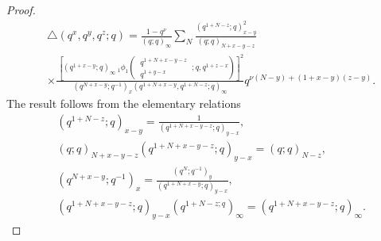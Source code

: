 \documentclass[12pt,a4paper]{amsart}
\numberwithin{equation}{section}
\theoremstyle{plain}
\theoremstyle{definition}
\theoremstyle{remark}
\numberwithin{equation}{section}
\numberwithin{table}{section}
\numberwithin{figure}{section}
\begin{document}
\begin{proof}
\begin{align*} &\triangle(q^x,q^y,q^z;q)=
\frac{1-q^{\nu}}{(q;q)_{\infty}} \sum_{N}\frac{(q^{1+N-z};q)^2_{x-y}}{(q;q)_{N+x-y-z}}\\&
\times \frac{\,\left[(q^{1+x-y};q)_{\infty}\ _{1}\phi_1\left(\begin{matrix} \ q^{1+N+x-y-z}\  \\
\ q^{1+y-x}\end{matrix};q,q^{1+z-x}\right) \right]^2
}{(q^{N+x-y};q^{-1})_{x}(q^{1+N+x-y},q^{1+N-z};q)_{\infty}}
q^{\nu(N-y)+(1+x-y)(z-y)}.
\end{align*}
The result follows from the elementary relations
\begin{align*}
&(q^{1+N-z};q)_{x-y}=\frac{1}{(q^{1+N+x-y-z};q)_{y-x}},\\&
(q;q)_{N+x-y-z}(q^{1+N+x-y-z};q)_{y-x}=(q;q)_{N-z},\\&
(q^{N+x-y};q^{-1})_{x}=\frac{(q^N;q^{-1})_y}{(q^{1+N+x-y};q)_{y-x}},\\&
(q^{1+N+x-y-z};q)_{y-x}(q^{1+N-z;q})_{\infty}=(q^{1+N+x-y-z};q)_{\infty}.
\end{align*}
\end{proof}
\end{document}
